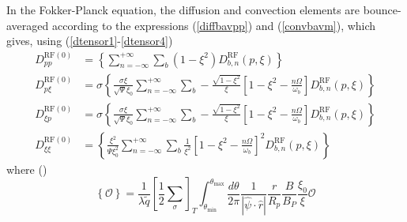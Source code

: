 
\label{fprfwavesection}\smallskip In the Fokker-Planck equation, the
diffusion and convection elements are bounce-averaged according to
the expressions (\ref{diffbavpp}) and (\ref{convbavm}), which gives,
using (\ref{dtensor1}-\ref{dtensor4})
\begin{align}
D_{pp}^{\text{RF}(0)}  &  =\left\{  \sum_{n=-\infty}^{+\infty}\sum_{b}%
(1-\xi^{2})D_{b,n}^{\text{RF}}(p,\xi)\right\} \\
D_{p\xi}^{\text{RF}(0)}  &  =\sigma\left\{  \frac{\sigma\xi}{\sqrt{\Psi}%
\xi_{0}}\sum_{n=-\infty}^{+\infty}\sum_{b}-\frac{\sqrt{1-\xi^{2}}}{\xi}\left[
1-\xi^{2}-\frac{n\Omega}{\omega_{b}}\right]  D_{b,n}^{\text{RF}}%
(p,\xi)\right\} \nonumber\\
D_{\xi p}^{\text{RF}(0)}  &  =\sigma\left\{  \frac{\sigma\xi}{\sqrt{\Psi}%
\xi_{0}}\sum_{n=-\infty}^{+\infty}\sum_{b}-\frac{\sqrt{1-\xi^{2}}}{\xi}\left[
1-\xi^{2}-\frac{n\Omega}{\omega_{b}}\right]  D_{b,n}^{\text{RF}}%
(p,\xi)\right\} \nonumber\\
D_{\xi\xi}^{\text{RF}(0)}  &  =\left\{  \frac{\xi^{2}}{\Psi\xi_{0}^{2}}%
\sum_{n=-\infty}^{+\infty}\sum_{b}\frac{1}{\xi^{2}}\left[  1-\xi^{2}%
-\frac{n\Omega}{\omega_{b}}\right]  ^{2}D_{b,n}^{\text{RF}}(p,\xi)\right\}
\nonumber
\end{align}
where ()
\begin{equation}
\left\{  \mathcal{O}\right\}  =\frac{1}{\lambda\widetilde{q}}\left[  \frac
{1}{2}\sum\limits_{\sigma}\right]  _{T}\int_{\theta_{\min}}^{\theta_{\max}%
}\frac{d\theta}{2\pi}\frac{1}{\left|  \widehat{\psi}\cdot\widehat{r}\right|
}\frac{r}{R_{p}}\frac{B}{B_{P}}\frac{\xi_{0}}{\xi}\mathcal{O}%
\end{equation}

